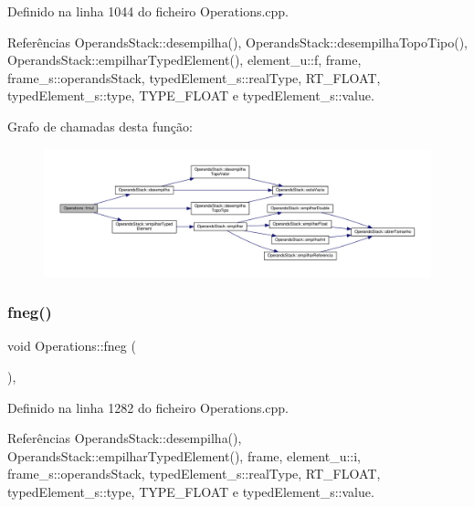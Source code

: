 Definido na linha 1044 do ficheiro Operations.\+cpp.



Referências Operands\+Stack\+::desempilha(), Operands\+Stack\+::desempilha\+Topo\+Tipo(), Operands\+Stack\+::empilhar\+Typed\+Element(), element\+\_\+u\+::f, frame, frame\+\_\+s\+::operands\+Stack, typed\+Element\+\_\+s\+::real\+Type, R\+T\+\_\+\+F\+L\+O\+AT, typed\+Element\+\_\+s\+::type, T\+Y\+P\+E\+\_\+\+F\+L\+O\+AT e typed\+Element\+\_\+s\+::value.

Grafo de chamadas desta função\+:\nopagebreak
\begin{figure}[H]
\begin{center}
\leavevmode
\includegraphics[width=350pt]{classOperations_ad4caf68c912edd7bfac5c8d74c1e2036_cgraph}
\end{center}
\end{figure}
\mbox{\label{classOperations_a17a7d8f333373d30ae5b1595d96594e5}} 
\subsubsection{\texorpdfstring{fneg()}{fneg()}}
{\footnotesize\ttfamily void Operations\+::fneg (\begin{DoxyParamCaption}{ }\end{DoxyParamCaption})\hspace{0.3cm}{\ttfamily [static]}, {\ttfamily [private]}}



Definido na linha 1282 do ficheiro Operations.\+cpp.



Referências Operands\+Stack\+::desempilha(), Operands\+Stack\+::empilhar\+Typed\+Element(), frame, element\+\_\+u\+::i, frame\+\_\+s\+::operands\+Stack, typed\+Element\+\_\+s\+::real\+Type, R\+T\+\_\+\+F\+L\+O\+AT, typed\+Element\+\_\+s\+::type, T\+Y\+P\+E\+\_\+\+F\+L\+O\+AT e typed\+Element\+\_\+s\+::value.


